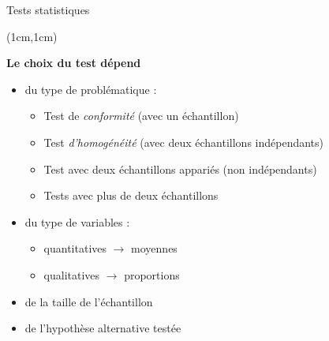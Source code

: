 \documentclass{beamer}
\begin{document}
\begin{frame}{Tests statistiques}
\begin{textblock*}{\textwidth}(1cm,1cm)
\begin{center}{\bf \Large Le choix du test dépend} \end{center}
\vspace{0.2cm}
\begin{itemize}
\item du type de problématique : 
\begin{itemize}
\item  Test de {\it conformité} (avec un échantillon)
\item  Test {\it d'homogénéité} (avec deux échantillons indépendants)
\item  Test avec deux échantillons appariés (non indépendants)
\item  Tests avec plus de deux échantillons
\end{itemize}
\vspace{0.15cm}
\item du type de variables :
\begin{itemize}
\item quantitatives $\rightarrow$ moyennes 
\item qualitatives $\rightarrow$ proportions 
\end{itemize}
\vspace{0.15cm}
\item de la taille de l'échantillon
\vspace{0.15cm}
\item de l'hypothèse alternative testée 
\end{itemize}

\end{textblock*}

\end{frame}

\end{document}
